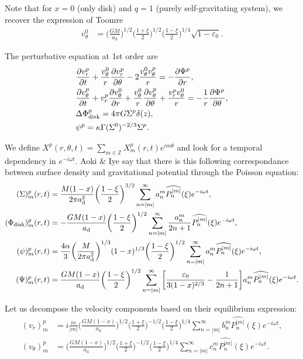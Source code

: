 \documentclass[11pt]{article}
\newcommand{\vr}{v_{r}}
\newcommand{\vt}{v_{\theta}}
\newcommand{\Phid}{\Phi_{\rm{disk}}}
\newcommand{\ad}{a_{\mathrm{d}}}
\newcommand{\anm}{a_n^m}
\newcommand{\bnm}{b_n^m}
\newcommand{\cnm}{c_n^m}
\newcommand{\Pnm}{P_n^{|m|}}
\newcommand{\hPnm}{\widehat{\Pnm}}
\begin{document}
Note that for $x=0$ (only disk) and $q=1$ (purely self-gravitating system), we recover the expression of Toomre
\begin{align}
\vt^0 &=\bigg(\frac{GM}{\ad} \bigg)^{1/2}\bigg(\frac{1+\xi}{2}\bigg)^{1/2} \bigg(\frac{1-\xi}{2}\bigg)^{1/4}  \sqrt{1- \varepsilon_0 } .
\end{align}

The perturbative equation at 1st order are
\begin{align}
&\frac{\partial \vr^p}{\partial t} + \frac{\vt^0}{r} \frac{\partial \vr^p}{\partial \theta} - 2\frac{\vt^0 \vt^p}{r} = -\frac{\partial \Psi^p}{\partial r} ,\\
&\frac{\partial \vt^p}{\partial t} + \vr^p \frac{\partial \vt^0}{\partial r} + \frac{\vt^0}{r} \frac{\partial \vt^p}{\partial \theta} + \frac{\vr^p\vt^0}{r} = -\frac{1}{r}\frac{\partial \Psi^p}{\partial \theta} ,\\
& \Delta \Phid^p = 4\pi G  \Sigma^p \delta (z), \\
& \psi^p =  \kappa \Gamma  (\Sigma^0)^{-2/3} \Sigma^p .
\end{align}

We define $X^p(r,\theta,t) = \sum_{m\in \mathbb{Z}} X_m^p(r,t) e^{i m \theta}$ and look for a temporal dependency in $e^{-i \omega t}$.
Aoki \& Iye say that there is this following correspondance between surface density and gravitational potential through the Poisson equation:
\begin{align}
(\Sigma)_m^p (r,t) &= \frac{M(1-x)}{2\pi \ad^2} \bigg(\frac{1-\xi}{2}\bigg)^{3/2} \sum_{n=|m|}^{\infty} \anm \hPnm(\xi) e^{-i \omega t} ,\\
(\Phid)_m^p (r,t) &= -\frac{GM(1-x)}{\ad} \bigg(\frac{1-\xi}{2}\bigg)^{1/2} \sum_{n=|m|}^{\infty} \frac{\anm}{2n+1} \hPnm(\xi) e^{-i \omega t} ,\\
(\psi)_m^p (r,t) &= \frac{4\alpha}{3}  \bigg(\frac{M}{2\pi \ad^2} \bigg)^{1/3} (1-x)^{1/3} \bigg(\frac{1-\xi}{2}\bigg)^{1/2} \sum_{n=|m|}^{\infty} \anm \hPnm(\xi) e^{-i \omega t} ,\\
(\Psi)_m^p (r,t) &= \frac{GM(1-x)}{\ad } \bigg(\frac{1-\xi}{2}\bigg)^{1/2}\sum_{n=|m|}^{\infty} \bigg[\frac{\varepsilon_0 }{3(1-x)^{2/3}}   -\frac{1}{2n+1}  \bigg]\anm \hPnm(\xi)e^{-i \omega t} .
\end{align}

Let us decompose the velocity components based on their equilibrium expression:
\begin{align}
(\vr)_m^p &= i \frac{m}{|m|} \bigg(\frac{GM(1-x)}{\ad}\bigg)^{1/2} \bigg(\frac{1+\xi}{2}\bigg)^{-1/2} \bigg(\frac{1-\xi}{2}\bigg)^{1/4} \sum_{n=|m|}^{\infty} \bnm \hPnm(\xi) e^{-i \omega t} ,\\
(\vt)_m^p &=\bigg(\frac{GM(1-x)}{\ad}\bigg)^{1/2} \bigg(\frac{1+\xi}{2}\bigg)^{-1/2} \bigg(\frac{1-\xi}{2}\bigg)^{1/4} \sum_{n=|m|}^{\infty} \cnm \hPnm(\xi) e^{-i \omega t} .
\end{align}
\end{document}
